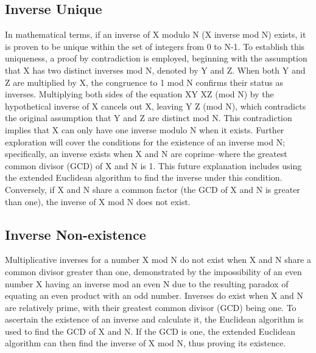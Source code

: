 \subsection*{Inverse  Unique}
In mathematical terms, if an inverse of X modulo N (X inverse mod N) exists, it is proven to be unique within the set of integers from 0 to N-1.
To establish this uniqueness, a proof by contradiction is employed, beginning with the assumption that X has two distinct inverses mod N, denoted by Y and Z\@.
When both Y and Z are multiplied by X, the congruence to 1 mod N confirms their status as inverses.
Multiplying both sides of the equation XY  XZ (mod N) by the hypothetical inverse of X cancels out X, leaving Y  Z (mod N), which contradicts the original assumption that Y and Z are distinct mod N\@.
This contradiction implies that X can only have one inverse modulo N when it exists.
Further exploration will cover the conditions for the existence of an inverse mod N; specifically, an inverse exists when X and N are coprime--where the greatest common divisor (GCD) of X and N is 1.
This future explanation includes using the extended Euclidean algorithm to find the inverse under this condition.
Conversely, if X and N share a common factor (the GCD of X and N is greater than one), the inverse of X mod N does not exist.

\subsection*{Inverse  Non-existence}
Multiplicative inverses for a number X mod N do not exist when X and N share a common divisor greater than one, demonstrated by the impossibility of an even number X having an inverse mod an even N due to the resulting paradox of equating an even product with an odd number.
Inverses do exist when X and N are relatively prime, with their greatest common divisor (GCD) being one.
To ascertain the existence of an inverse and calculate it, the Euclidean algorithm is used to find the GCD of X and N\@.
If the GCD is one, the extended Euclidean algorithm can then find the inverse of X mod N, thus proving its existence.

